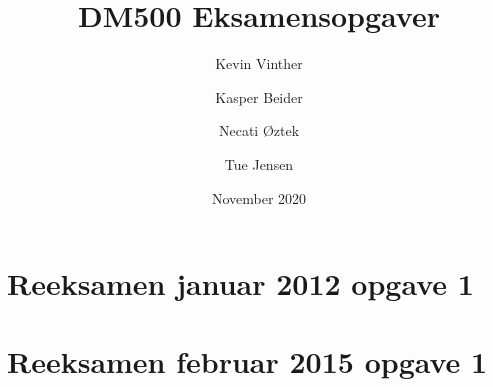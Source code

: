 \documentclass{article}
\title{DM500 Eksamensopgaver}
\author{ Kevin Vinther \and Kasper Beider \and Necati Øztek \and Tue Jensen }
\date{November 2020}
\begin{document}
\maketitle

\newpage

\section{Reeksamen januar 2012 opgave 1}

\section{Reeksamen februar 2015 opgave 1}
\end{document}
